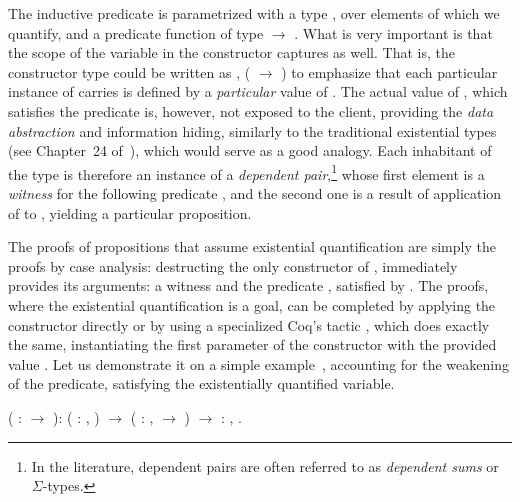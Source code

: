 The inductive predicate  is parametrized with a type , over
elements of which we quantify, and a predicate function of type  \ensuremath{\rightarrow}
. What is very important is that the scope of the variable  in
the constructor captures    as well. That is, the constructor
type could be written as \coqdockw{\ensuremath{\forall}} , (  \ensuremath{\rightarrow}   ) to emphasize that
each particular instance of    carries is defined by a
\textit{particular} value of . The actual value of , which satisfies
the predicate  is, however, not exposed to the client, providing
the \textit{data abstraction} and information hiding, similarly to the
traditional existential types (see Chapter~24
of~\cite{Pierce:BOOK02}), which would serve as a good analogy.  Each
inhabitant of the type  is therefore an instance of a
\emph{dependent pair},\footnote{In the literature, dependent pairs
are often referred to as \emph{dependent sums} or
$\Sigma$-types.} whose first element is a
\textit{witness} for the following predicate , and the second one is a
result of application of  to , yielding a particular
proposition.




The proofs of propositions that assume existential quantification are
simply the proofs by case analysis: destructing the only constructor
of , immediately provides its arguments: a witness  and the
predicate , satisfied by . The proofs, where the existential
quantification is a goal, can be completed by applying the constructor
 directly or by using a specialized Coq's tactic  ,
which does exactly the same, instantiating the first parameter of the
constructor with the provided value . Let us demonstrate it on a
simple example~\cite[\S 5.2.6]{Bertot-Casteran:BOOK}, accounting for
the weakening of the predicate, satisfying the existentially
quantified variable.


\begin{coqdoccode}
\coqdocemptyline
\coqdocnoindent
{}   ( :  \ensuremath{\rightarrow} ): \coqdoceol
\coqdocindent{1.00em}
( : ,  ) \ensuremath{\rightarrow} (\coqdockw{\ensuremath{\forall}} : ,   \ensuremath{\rightarrow}  ) \ensuremath{\rightarrow}  : ,  .\coqdoceol
\coqdocemptyline
\end{coqdoccode}


